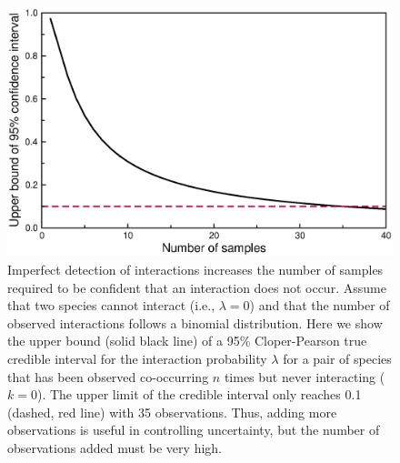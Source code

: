 \documentclass[12pt]{article}
\begin{document}
  \begin{figure}[h!]
    \caption{Imperfect detection of interactions increases the number of samples required to be confident that an interaction does not occur. Assume that two species cannot interact (i.e., $\lambda=0$) and that the number of observed interactions follows a binomial distribution. Here we show the upper bound (solid black line) of a 95\% Cloper-Pearson true credible interval for the interaction probability $\lambda$ for a pair of species that has been observed co-occurring $n$ times but never interacting ($k = 0$). The upper limit of the credible interval only reaches 0.1 (dashed, red line) with 35 observations. Thus, adding more observations is useful in controlling uncertainty, but the number of observations added must be very high. }
    \label{upper_limits}
    \begin{center}
    \includegraphics*[width=.8\textwidth]{figures/upper_limit_DG.eps}
    \end{center}
    \end{figure}
\end{document}
